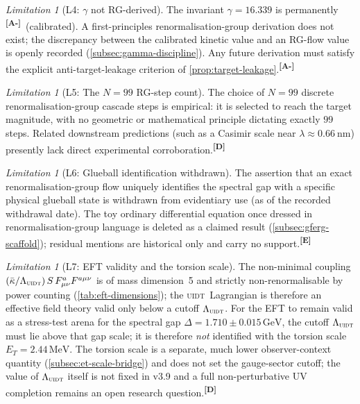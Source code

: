 \documentclass[12pt,a4paper,twoside]{article}
\theoremstyle{plain}
\theoremstyle{definition}
\theoremstyle{remark}
\newtheorem{limitation}[theorem]{Limitation}
\newcommand{\UIDT}{\textsc{uidt}}
\newcommand{\GeV}{\,\mathrm{GeV}}
\newcommand{\MeV}{\,\mathrm{MeV}}
\newcommand{\catmark}[1]{\textsuperscript{\textsf{\textbf{[#1]}}}}
\newcommand{\DeltaGap}{1.710 \pm 0.015\GeV} %
\newcommand{\GammaGeom}{16.339} %
\newcommand{\ETorsion}{2.44\MeV} %
\begin{document}
\begin{limitation}[L4: $\gamma$ not RG-derived]
\label{lim:L4}
The invariant $\gamma = \GammaGeom$ is permanently \catmark{A-}\ (calibrated). A first-principles renormalisation-group derivation does not exist; the discrepancy between the calibrated kinetic value and an RG-flow value is openly recorded (\cref{subsec:gamma-discipline}). Any future derivation must satisfy the explicit anti-target-leakage criterion of \cref{prop:target-leakage}.\catmark{A-}
\end{limitation}

\begin{limitation}[L5: The $N=99$ RG-step count]
\label{lim:L5}
The choice of $N=99$ discrete renormalisation-group cascade steps is empirical: it is selected to reach the target magnitude, with no geometric or mathematical principle dictating exactly $99$ steps. Related downstream predictions (such as a Casimir scale near $\lambda \approx 0.66\ \mathrm{nm}$) presently lack direct experimental corroboration.\catmark{D}
\end{limitation}

\begin{limitation}[L6: Glueball identification withdrawn]
\label{lim:L6}
The assertion that an exact renormalisation-group flow uniquely identifies the spectral gap with a specific physical glueball state is withdrawn from evidentiary use (as of the recorded withdrawal date). The toy ordinary differential equation once dressed in renormalisation-group language is deleted as a claimed result (\cref{subsec:gferg-scaffold}); residual mentions are historical only and carry no support.\catmark{E}
\end{limitation}

\begin{limitation}[L7: EFT validity and the torsion scale]
\label{lim:L7}
The non-minimal coupling $(\bar\kappa/\Lambda_{\UIDT})\,S\,F_{\mu\nu}^a F^{a\mu\nu}$ is of mass dimension~5 and strictly non-renormalisable by power counting (\cref{tab:eft-dimensions}); the \UIDT\ Lagrangian is therefore an effective field theory valid only below a cutoff $\Lambda_{\UIDT}$. For the EFT to remain valid as a stress-test arena for the spectral gap $\Delta = \DeltaGap$, the cutoff $\Lambda_{\UIDT}$ must lie above that gap scale; it is therefore \emph{not} identified with the torsion scale $E_T = \ETorsion$. The torsion scale is a separate, much lower observer-context quantity (\cref{subsec:et-scale-bridge}) and does not set the gauge-sector cutoff; the value of $\Lambda_{\UIDT}$ itself is not fixed in v3.9 and a full non-perturbative UV completion remains an open research question.\catmark{D}
\end{limitation}
\end{document}
